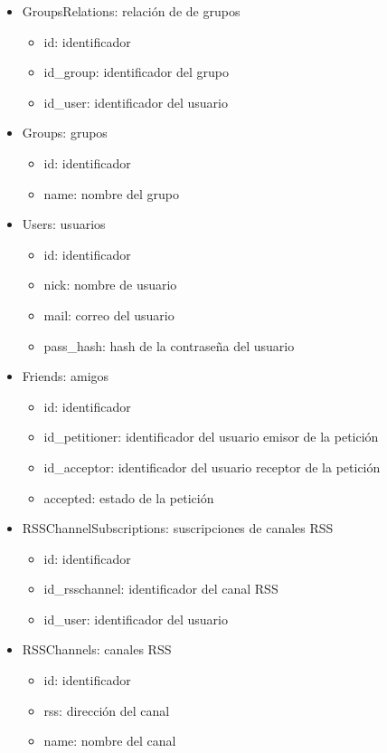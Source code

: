 \documentclass[12pt, a4paper]{book} %
\begin{document}
		\begin{itemize}
			\item GroupsRelations: relación de de grupos
			\begin{itemize}
				\item id: identificador
				\item id\_group: identificador del grupo
				\item id\_user: identificador del usuario
			\end{itemize}
			\item Groups: grupos
			\begin{itemize}
				\item id: identificador
				\item name: nombre del grupo
			\end{itemize}
			\item Users: usuarios
			\begin{itemize}
				\item id: identificador
				\item nick: nombre de usuario
				\item mail: correo del usuario
				\item pass\_hash: hash de la contraseña del usuario
			\end{itemize}
			\item Friends: amigos
			\begin{itemize}
				\item id: identificador
				\item id\_petitioner: identificador del usuario emisor de la petición
				\item id\_acceptor: identificador del usuario receptor de la petición
				\item accepted: estado de la petición
			\end{itemize}
			\item RSSChannelSubscriptions: suscripciones de canales RSS
			\begin{itemize}
				\item id: identificador
				\item id\_rsschannel: identificador del canal RSS
				\item id\_user: identificador del usuario
			\end{itemize}
			\item RSSChannels: canales RSS
			\begin{itemize}
				\item id: identificador
				\item rss: dirección del canal
				\item name: nombre del canal
			\end{itemize}
		\end{itemize}
\end{document}
